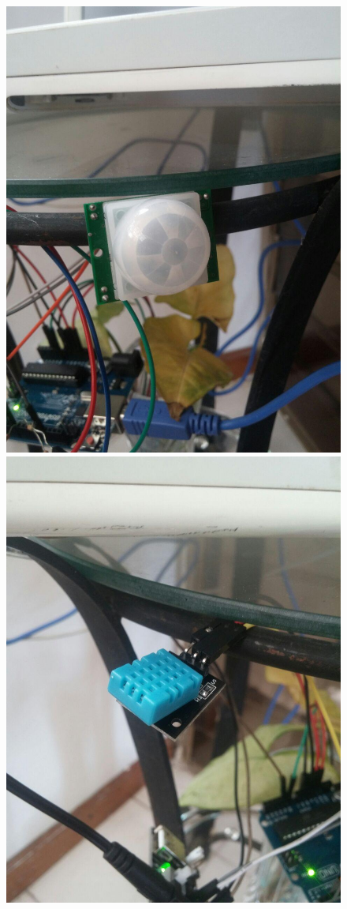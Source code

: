 \begin{itemize}
\begin{figure}[htb]
\includegraphics[scale=0.11]{./Figuras/pir_ext.jpg}
\includegraphics[scale=0.11]{./Figuras/temp_ext.jpg}

\end{figure}
\end{itemize}
